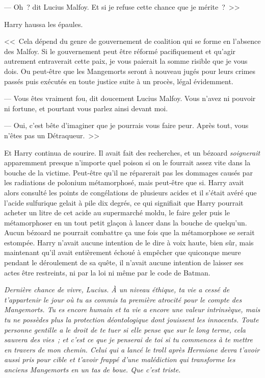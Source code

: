 --- Oh~? dit Lucius Malfoy. Et si je refuse cette chance que je mérite~?~>>

Harry haussa les épaules.

<<~Cela dépend du genre de gouvernement de coalition qui se forme en l'absence des Malfoy. Si le gouvernement peut être réformé pacifiquement et qu'agir autrement entraverait cette paix, je vous paierait la somme risible que je vous dois. Ou peut-être que les Mangemorts seront à nouveau jugés pour leurs crimes passés puis exécutés en toute justice suite à un procès, légal évidemment.

--- Vous êtes vraiment fou, dit doucement Lucius Malfoy. Vous n'avez ni pouvoir ni fortune, et pourtant vous parlez ainsi devant moi.

--- Oui, c'est bête d'imaginer que je pourrais vous faire peur. Après tout, vous n'êtes pas un Détraqueur.~>>

Et Harry continua de sourire. Il avait fait des recherches, et un bézoard \emph{soignerait} apparemment presque n'importe quel poison si on le fourrait assez vite dans la bouche de la victime. Peut-être qu'il ne réparerait pas les dommages causés par les radiations de polonium métamorphosé, mais peut-être que si. Harry avait alors consulté les points de congélations de plusieurs acides et il s'était avéré que l'acide sulfurique gelait à pile dix degrés, ce qui signifiait que Harry pourrait acheter un litre de cet acide au supermarché moldu, le faire geler puis le métamorphoser en un tout petit glaçon à lancer dans la bouche de quelqu'un. Aucun bézoard ne pourrait combattre ça une fois que la métamorphose se serait estompée. Harry n'avait aucune intention de le dire à voix haute, bien sûr, mais maintenant qu'il avait entièrement échoué à empêcher que quiconque meure pendant le déroulement de sa quête, il n'avait aucune intention de laisser ses actes être restreints, ni par la loi ni même par le code de Batman.

\emph{Dernière chance de vivre, Lucius. À un niveau éthique, ta vie a cessé de t'appartenir le jour où tu as commis ta première atrocité pour le compte des Mangemorts. Tu es encore humain et ta vie a encore une valeur intrinsèque, mais tu ne possèdes plus la protection déontologique dont jouissent les innocents. Toute personne gentille a le droit de te tuer si elle pense que sur le long terme, cela sauvera des vies~; et c'est ce que je penserai de toi si tu commences à te mettre en travers de mon chemin. Celui qui a lancé le troll après Hermione devra t'avoir aussi pris pour cible et t'avoir frappé d'une malédiction qui transforme les anciens Mangemorts en un tas de boue. Que c'est triste.}

